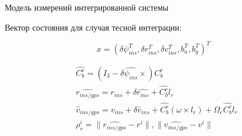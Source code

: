 \documentclass[aspectratio=43,display]{beamer}
\begin{document}
\begin{frame}{Модель измерений интегрированной системы}
		
	Вектор состояния для случая тесной интеграции: 
	
	\begin{equation} \label{eq:tr_mat}
		x = (\delta \psi_{ins} ^ T, \delta r_{ins} ^ T, \delta v_{ins} ^ T, 
		b_{a} ^ T, b_{g} ^ T) ^ T
	\end{equation}

\vspace{0.5cm}

\begin{fleqn}
	\begin{equation} \label{eq:tr_mat}
		\begin{split} 
				& \hat{C_b^e} = (I_3 - \delta \hat{\psi_{ins}} \times)C_b^e \\
				& \hat{r_{ins/gps}} = r_{ins} + \delta \hat{r_{ins}} + \hat{C_b^e}l_{r} \\ 
				& \hat{v}_{ins/gps} = v_{ins} + \delta \hat{v}_{ins} + \hat{C_b^e} (\omega \times l_r) + \Omega_e \hat{C_b^e} l_r \\ 
				& \rho_r^i = \parallel \hat{r_{ins/gps}} - r^i \parallel, 
				\parallel \hat{v_{ins/gps}} - v^i \parallel  
		\end{split}
	\end{equation}
\end{fleqn}

\end{frame}
\end{document}
